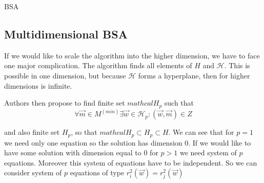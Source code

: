 \begin{algorithm}[H]
    \label{alg:border:scanning:bsa:onedim}

      \caption{BSA}


      

    \;
\end{algorithm}


\subsection{Multidimensional BSA}

If we would like to scale the algorithm into the higher dimension, we have to face one major complication. The algorithm finds all elements of $H$ and $\mathcal{H}$. This is possible in one dimension, but because $\mathcal{H}$ forms a hyperplane, then for higher dimensions is infinite.

Authors then propose to find finite set $mathcal{H}_p$ such that 
\begin{equation} \label{hp:set:condition}
    \forall \vec{m} \in M^{(min)} \exists \vec{w} \in \mathcal{H}_p : (\vec{w},\vec{m}) \in Z
\end{equation}

and also finite set $H_p$, so that $mathcal{H}_p \subset H_p \subset H$. We can see that for $p=1$ we need only one equation so the solution has dimension $0$. If we would like to have some solution with dimension equal to $0$ for $p > 1$ we need system of $p$ equations. Moreover this system of equations have to be independent. So we can consider system of $p$ equations of type $ r^{2}_i(\vec{w}) = r^{2}_j(\vec{w})$

